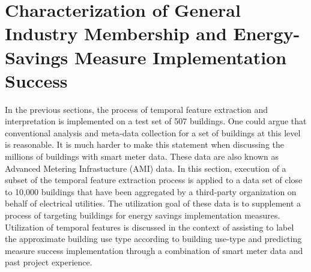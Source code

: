 \section{Characterization of General Industry Membership and Energy-Savings Measure Implementation Success}
\label{sec:scalability}

In the previous sections, the process of temporal feature extraction and interpretation is implemented on a test set of 507 buildings. One could argue that conventional analysis and meta-data collection for a set of buildings at this level is reasonable. It is much harder to make this statement when discussing the millions of buildings with smart meter data. These data are also known as Advanced Metering Infrastucture (AMI) data.  In this section, execution of a subset of the temporal feature extraction process is applied to a data set of close to 10,000 buildings that have been aggregated by a third-party organization on behalf of electrical utilities. The utilization goal of these data is to supplement a process of targeting buildings for energy savings implementation measures. Utilization of temporal features is discussed in the context of assisting to label the approximate building use type according to building use-type and predicting measure success implementation through a combination of smart meter data and past project experience.


